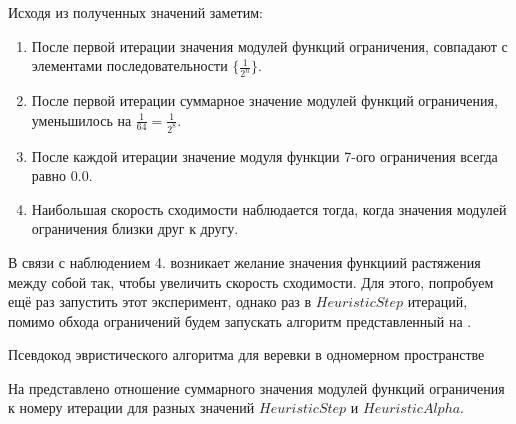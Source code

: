 	Исходя из полученных значений заметим:
	\begin{enumerate}[1.]
		\item После первой итерации значения модулей функций ограничения, совпадают с элементами последовательности $\{\frac{1}{2^n}\}$.
		\item После первой итерации суммарное значение модулей функций ограничения, уменьшилось на $\frac{1}{64} =\frac{1}{2^8}$.
		\item После каждой итерации значение модуля функции 7-ого ограничения всегда равно $0.0$. 
		\item Наибольшая скорость сходимости наблюдается тогда, когда значения модулей ограничения близки друг к другу.
	\end{enumerate}

	В связи с наблюдением 4. возникает желание  значения функциий растяжения между собой так, чтобы увеличить скорость сходимости. Для этого, попробуем ещё раз запустить этот эксперимент, однако раз в $HeuristicStep$ итераций, помимо обхода ограничений будем запускать алгоритм представленный на .
	
	\begin{algorithm} %
		\nonl{}
		\caption{Псевдокод эвристического алгоритма для веревки в одномерном пространстве}\label{alg:Heuristic1D}
	\end{algorithm}
	\FloatBarrier
	
	На   представлено отношение суммарного значения модулей функций ограничения к номеру итерации для разных значений $HeuristicStep$ и $HeuristicAlpha$. 
	
